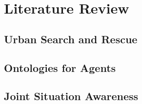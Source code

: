 \chapter{Literature Review}
\section{Urban Search and Rescue}
\section{Ontologies for Agents}
\section{Joint Situation Awareness}
